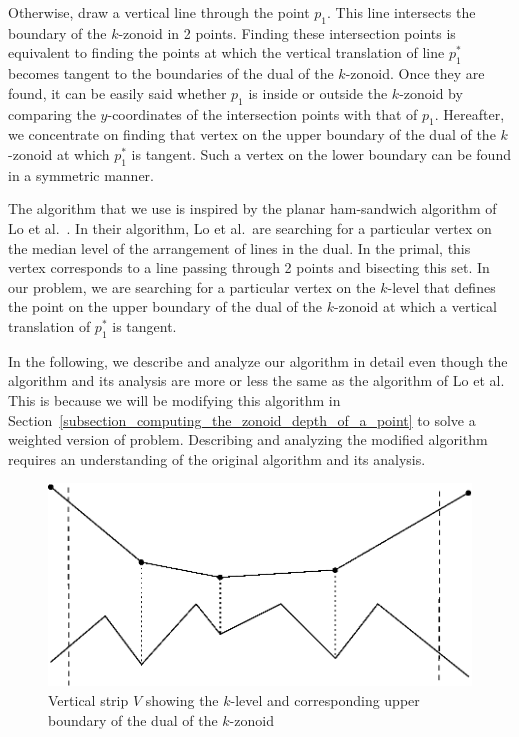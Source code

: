 \documentclass{elsart}
\begin{document}
Otherwise, draw a vertical line through the point $p_1$. This line
intersects the boundary of the $k$-zonoid in 2 points.  Finding these
intersection points is equivalent to finding the points at which the
vertical translation of line $p_1^*$ becomes tangent to the boundaries
of the dual of the $k$-zonoid. Once they are found, it can be easily
said whether $p_1$ is inside or outside the $k$-zonoid by comparing
the $y$-coordinates of the intersection points with that of  $p_1$.
Hereafter, we concentrate on finding that vertex on the upper boundary
of the dual of the $k$-zonoid at which $p_1^*$ is tangent. Such a
vertex on the lower boundary can be found in a symmetric manner. 

The algorithm that we use is inspired by the planar ham-sandwich
algorithm of Lo et al.\ \cite{algorithms_for_ham_sandwich_cuts}. In
their algorithm, Lo et al.\ are searching for a particular vertex on
the median level of the arrangement of lines in the dual. In the
primal, this vertex corresponds to a line passing through 2 points and
bisecting this set. In our problem, we are searching for a particular
vertex on the $k$-level that defines the point on the upper boundary
of the dual of the $k$-zonoid at which a vertical translation of
$p_1^*$ is tangent.

In the following, we describe and analyze our algorithm in detail even
though the algorithm and its analysis are more or less the same as the
algorithm of Lo et al.  This is because we will be modifying this
algorithm in
Section~\ref{subsection_computing_the_zonoid_depth_of_a_point} to
solve a weighted version of problem.  Describing and analyzing the
modified algorithm requires an understanding of the original algorithm
and its analysis.

\begin{figure}
 \begin{center} 
   \includegraphics{fig5}
   \caption{\label{fig_vertical_strip}Vertical strip $V$ showing the $k$-level and corresponding upper boundary of the dual of the $k$-zonoid}
 \end{center}
\end{figure}
\end{document}

